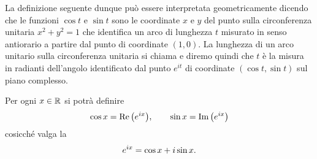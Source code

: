 La definizione seguente dunque può essere interpretata geometricamente 
dicendo che le funzioni $\cos t$ e $\sin t$ sono le coordinate 
$x$ e $y$ del punto sulla circonferenza unitaria $x^2+y^2=1$ 
che identifica un arco di lunghezza $t$ misurato in senso antiorario 
a partire dal punto di coordinate $(1,0)$. 
La lunghezza di un arco unitario sulla circonferenza unitaria 
si chiama  e diremo quindi che $t$
è la misura in radianti dell'angolo identificato dal punto $e^{it}$
di coordinate $(\cos t, \sin t)$ sul piano complesso.


\begin{definition}%
\label{def:sincos}%
\index{$\cos$}%
\index{$\sin$}%
%
%
%
Per ogni $x\in {\mathbb R}$ si potrà definire
\[
  \cos x = \operatorname{Re} {\left( e^{ix} \right)}, \qquad
  \sin x = \operatorname{Im} {\left( e^{ix} \right)}
\]
cosicché valga la
%
\[
  \mymark{***}%
  e^{ix} = \cos x + i \sin x.
\]
\end{definition}


